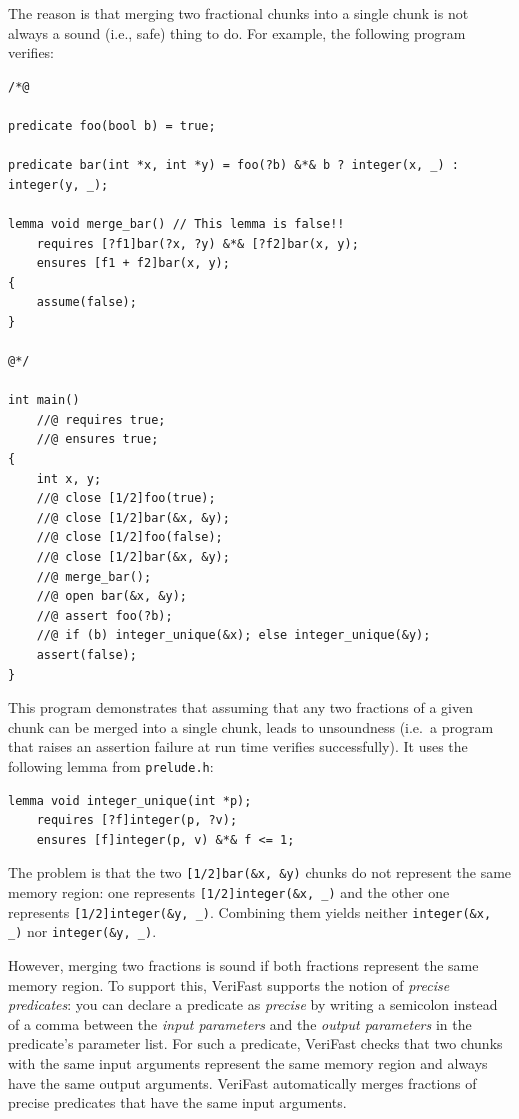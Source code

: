 \documentclass{article}
\begin{document}
The reason is that merging two fractional chunks into a single
chunk is not always a sound (i.e., safe) thing to do. For
example, the following program verifies:
\begin{lstlisting}
/*@

predicate foo(bool b) = true;

predicate bar(int *x, int *y) = foo(?b) &*& b ? integer(x, _) : integer(y, _);

lemma void merge_bar() // This lemma is false!!
    requires [?f1]bar(?x, ?y) &*& [?f2]bar(x, y);
    ensures [f1 + f2]bar(x, y);
{
    assume(false);
}

@*/

int main()
    //@ requires true;
    //@ ensures true;
{
    int x, y;
    //@ close [1/2]foo(true);
    //@ close [1/2]bar(&x, &y);
    //@ close [1/2]foo(false);
    //@ close [1/2]bar(&x, &y);
    //@ merge_bar();
    //@ open bar(&x, &y);
    //@ assert foo(?b);
    //@ if (b) integer_unique(&x); else integer_unique(&y);
    assert(false);
}
\end{lstlisting}
This program demonstrates that assuming that any two fractions
of a given chunk can be merged into a single chunk, leads to
unsoundness (i.e.~a program that raises an assertion failure at
run time verifies successfully). It uses the following lemma
from \lstinline|prelude.h|:
\begin{lstlisting}
lemma void integer_unique(int *p);
    requires [?f]integer(p, ?v);
    ensures [f]integer(p, v) &*& f <= 1;
\end{lstlisting}

The problem is that the two \lstinline|[1/2]bar(&x, &y)| chunks
do not represent the same memory region: one represents
\lstinline|[1/2]integer(&x, _)| and the other one represents
\lstinline|[1/2]integer(&y, _)|. Combining them yields neither
\lstinline|integer(&x, _)| nor \lstinline|integer(&y, _)|.

However, merging two fractions is sound if both fractions
represent the same memory region. To support this, VeriFast
supports the notion of \emph{precise predicates}: you can
declare a predicate as \emph{precise} by writing a semicolon
instead of a comma between the \emph{input parameters} and the
\emph{output parameters} in the predicate's parameter list. For
such a predicate, VeriFast checks that two chunks with the same
input arguments represent the same memory region and always
have the same output arguments. VeriFast automatically merges
fractions of precise predicates that have the same input
arguments.
\end{document}
